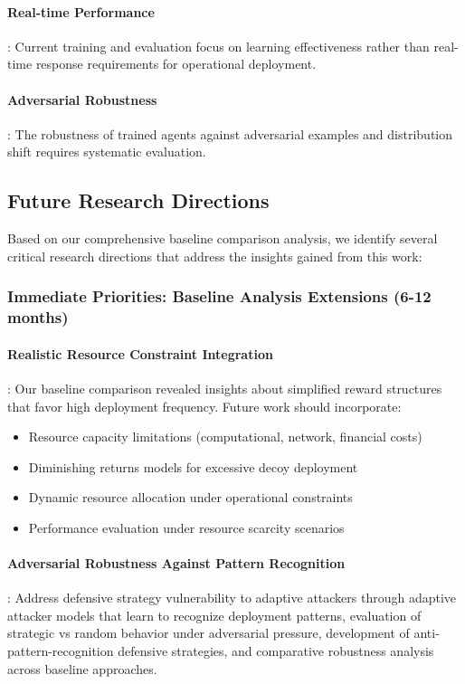 \documentclass[12pt,oneside]{article}
\begin{document}
\paragraph{Real-time Performance}: Current training and evaluation focus on learning effectiveness rather than real-time response requirements for operational deployment.

\paragraph{Adversarial Robustness}: The robustness of trained agents against adversarial examples and distribution shift requires systematic evaluation.

\subsection{Future Research Directions}

Based on our comprehensive baseline comparison analysis, we identify several critical research directions that address the insights gained from this work:

\subsubsection{Immediate Priorities: Baseline Analysis Extensions (6-12 months)}

\paragraph{Realistic Resource Constraint Integration}: Our baseline comparison revealed insights about simplified reward structures that favor high deployment frequency. Future work should incorporate:
\begin{itemize}
\item Resource capacity limitations (computational, network, financial costs)
\item Diminishing returns models for excessive decoy deployment
\item Dynamic resource allocation under operational constraints
\item Performance evaluation under resource scarcity scenarios
\end{itemize}

\paragraph{Adversarial Robustness Against Pattern Recognition}: Address defensive strategy vulnerability to adaptive attackers through adaptive attacker models that learn to recognize deployment patterns, evaluation of strategic vs random behavior under adversarial pressure, development of anti-pattern-recognition defensive strategies, and comparative robustness analysis across baseline approaches.
\end{document}
